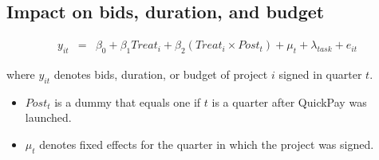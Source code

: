 \documentclass[]{article}
\providecommand{\tightlist}{%
  \setlength{\itemsep}{0pt}\setlength{\parskip}{0pt}}
\begin{document}
\hypertarget{impact-on-bids-duration-and-budget}{%
\subsection{Impact on bids, duration, and
budget}\label{impact-on-bids-duration-and-budget}}

\[ \begin{aligned}
y_{it} &=& \beta_0 + \beta_1 Treat_i + \beta_2 (Treat_i \times Post_t) +\mu_t+ \lambda_{task}+ e_{it}
\end{aligned}\]

where \(y_{it}\) denotes bids, duration, or budget of project \(i\)
signed in quarter \(t\).

\begin{itemize}
\tightlist
\item
  \(Post_t\) is a dummy that equals one if \(t\) is a quarter after
  QuickPay was launched.
\item
  \(\mu_t\) denotes fixed effects for the quarter in which the project
  was signed.
\end{itemize}
\end{document}
